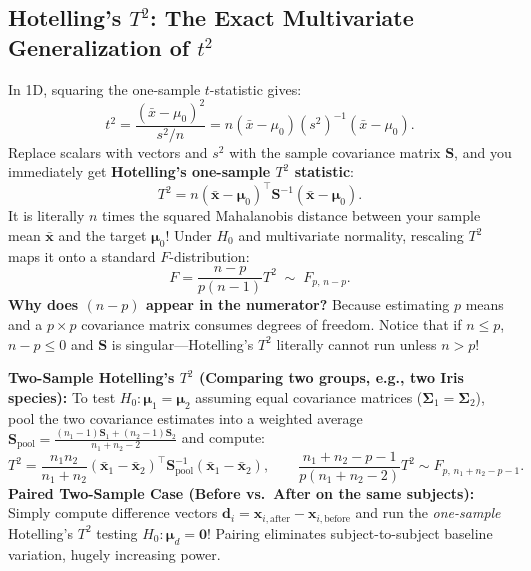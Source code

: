 \documentclass[11pt, a4paper]{article}
\begin{document}
\subsection{Hotelling's $T^2$: The Exact Multivariate Generalization of $t^2$}
In 1D, squaring the one-sample $t$-statistic gives:
\[
    t^2 = \frac{(\bar{x} - \mu_0)^2}{s^2 / n} = n (\bar{x} - \mu_0)(s^2)^{-1}(\bar{x} - \mu_0).
\]
Replace scalars with vectors and $s^2$ with the sample covariance matrix $\mathbf{S}$, and you immediately get \textbf{Hotelling's one-sample $T^2$ statistic}:
\[
    T^2 = n (\bar{\mathbf{x}} - \boldsymbol{\mu}_0)^\top \mathbf{S}^{-1} (\bar{\mathbf{x}} - \boldsymbol{\mu}_0).
\]
It is literally $n$ times the squared Mahalanobis distance between your sample mean $\bar{\mathbf{x}}$ and the target $\boldsymbol{\mu}_0$! Under $H_0$ and multivariate normality, rescaling $T^2$ maps it onto a standard $F$-distribution:
\[
    F = \frac{n - p}{p(n - 1)} T^2 \;\sim\; F_{p,\, n-p}.
\]
\textbf{Why does $(n-p)$ appear in the numerator?} Because estimating $p$ means and a $p \times p$ covariance matrix consumes degrees of freedom. Notice that if $n \le p$, $n - p \le 0$ and $\mathbf{S}$ is singular---Hotelling's $T^2$ literally cannot run unless $n > p$!

\textbf{Two-Sample Hotelling's $T^2$ (Comparing two groups, e.g., two Iris species):}
To test $H_0: \boldsymbol{\mu}_1 = \boldsymbol{\mu}_2$ assuming equal covariance matrices ($\boldsymbol{\Sigma}_1 = \boldsymbol{\Sigma}_2$), pool the two covariance estimates into a weighted average $\mathbf{S}_{\text{pool}} = \frac{(n_1 - 1)\mathbf{S}_1 + (n_2 - 1)\mathbf{S}_2}{n_1 + n_2 - 2}$ and compute:
\[
    T^2 = \frac{n_1 n_2}{n_1 + n_2} (\bar{\mathbf{x}}_1 - \bar{\mathbf{x}}_2)^\top \mathbf{S}_{\text{pool}}^{-1} (\bar{\mathbf{x}}_1 - \bar{\mathbf{x}}_2),
    \qquad
    \frac{n_1 + n_2 - p - 1}{p(n_1 + n_2 - 2)} T^2 \sim F_{p,\, n_1+n_2-p-1}.
\]
\textbf{Paired Two-Sample Case (Before vs.\ After on the same subjects):} Simply compute difference vectors $\mathbf{d}_i = \mathbf{x}_{i,\text{after}} - \mathbf{x}_{i,\text{before}}$ and run the \emph{one-sample} Hotelling's $T^2$ testing $H_0: \boldsymbol{\mu}_d = \mathbf{0}$! Pairing eliminates subject-to-subject baseline variation, hugely increasing power.
\end{document}

